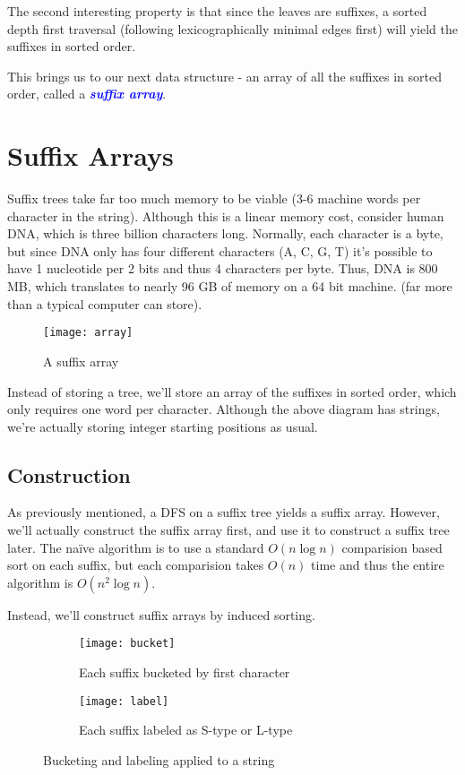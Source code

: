 \documentclass[11pt, oneside]{article}
\newcommand{\emphasis}[1]{\textcolor{blue}{\textbf{\textit{#1}}}}
\begin{document}
The second interesting property is that since the leaves are suffixes, a sorted depth first traversal
(following lexicographically minimal edges first) will yield the suffixes in sorted order.

This brings us to our next data structure - an array of all the suffixes in sorted order, called a \emphasis{suffix array}.

\section{Suffix Arrays}

Suffix trees take far too much memory to be viable (3-6 machine words per character in the string).
Although this is a linear memory cost, consider human DNA, which is three billion characters long.
Normally, each character is a byte, but since DNA only has four different characters (A, C, G, T)
it's possible to have 1 nucleotide per 2 bits and thus 4 characters per byte.
Thus, DNA is 800 MB, which translates to nearly 96 GB of memory on a 64 bit machine.
(far more than a typical computer can store).

\begin{figure}[h!]
\centering
\texttt{[image: array]}
\caption{A suffix array}
\end{figure}

Instead of storing a tree, we'll store an array of the suffixes in sorted order,
which only requires one word per character. Although the above diagram has strings,
we're actually storing integer starting positions as usual.

\subsection{Construction}

As previously mentioned, a DFS on a suffix tree yields a suffix array.
However, we'll actually construct the suffix array first, and use it to construct a
suffix tree later. The naïve algorithm is to use a standard \( O(n \log n) \) comparision based
sort on each suffix, but each comparision takes \( O(n) \) time and thus the entire algorithm
is \( O(n^2 \log n) \).

Instead, we'll construct suffix arrays by induced sorting.

\begin{figure}[h!]
    \centering
    \begin{subfigure}[h]{\textwidth}
      \centering
      \texttt{[image: bucket]}
      \caption{Each suffix bucketed by first character}
    \end{subfigure}
    \newline
    \begin{subfigure}[h]{\textwidth}
      \centering
      \texttt{[image: label]}
      \caption{Each suffix labeled as S-type or L-type}
    \end{subfigure}
    \caption{Bucketing and labeling applied to a string}
\end{figure}
\end{document}
